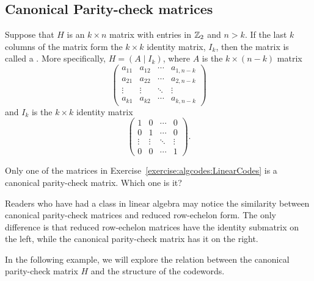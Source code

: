 \subsection{Canonical Parity-check matrices}

\begin{defn}
  Suppose that $H$ is an $k \times n$ matrix with entries in
${\Bbb Z}_2$ and $n > k$. If the last $k$ columns of the
matrix form the $k \times k$ identity matrix, $I_k$, then
the matrix is called a . More specifically, $H= (A \mid I_k
)$, where $A$ is the $k \times (n-k)$ matrix
\[
\left(
\begin{array}{cccc}
a_{11} & a_{12} & \cdots & a_{1,n-k} \\
a_{21} & a_{22} & \cdots & a_{2,n-k} \\
\vdots & \vdots & \ddots & \vdots    \\
a_{k1} & a_{k2} & \cdots & a_{k,n-k}
\end{array}
\right)
\]
and $I_k$ is the $k \times k$ identity matrix
\[
\left(
\begin{array}{cccc}
1 & 0 & \cdots & 0 \\
0 & 1 & \cdots & 0 \\
\vdots & \vdots & \ddots & \vdots \\
0 & 0 & \cdots & 1
\end{array}
\right).
\]
\end{defn}

\begin{exercise}{}
Only one of the matrices in Exercise~\ref{exercise:algcodes:LinearCodes} is a canonical parity-check matrix. Which one is it?
\end{exercise}

Readers who have had a class in linear algebra may notice the similarity between canonical parity-check matrices and reduced row-echelon form. The only difference is that reduced row-echelon matrices have the identity submatrix on the left, while the canonical parity-check matrix has it on the right.

In the following example, we will explore the relation between the canonical parity-check matrix $H$ and the structure of the codewords.
 
